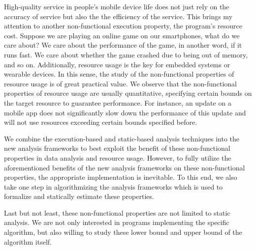 High-quality
service in people's mobile device life does not just rely on the accuracy of service but also the
 the efficiency of the service. 
This brings my attention to another non-functional execution property, the program's resource cost.
Suppose we are playing an online game on our smartphones, what do we care about? We care about the performance of the game, in another word, if it runs fast. We care about whether the game crashed due to being out of memory, and so on. Additionally, resource usage is the key for embedded systems or wearable devices. In this sense, the study of the non-functional properties of resource usage is of great practical value. We observe that the non-functional properties of resource usage are usually quantitative, specifying certain bounds on the target resource to guarantee performance. For instance, an update on a mobile app does not significantly slow down the performance of this update and will not use resources exceeding certain bounds specified before.


We combine the
execution-based and static-based
analysis techniques into the new
analysis frameworks to best exploit the benefit of these non-functional properties in data analysis and resource usage. However, to fully utilize the aforementioned benefits of the new analysis frameworks on these non-functional properties, the appropriate implementation is inevitable. 
To this end, we also take one step in algorithmizing the analysis frameworks
which is used to formalize and statically estimate these properties.

Last but not least, these non-functional properties are not limited to static analysis. 
We are not only interested in programs implementing the specific algorithm, but also willing to study these lower bound and upper bound of the algorithm itself.
